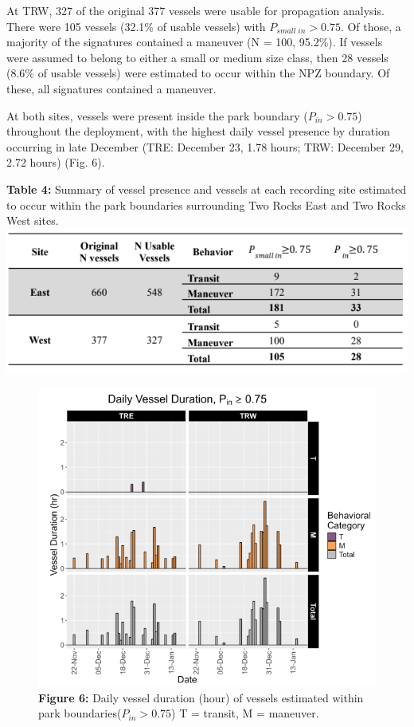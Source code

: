 \documentclass[
  letterpaper,
  oneside,
  open=any]{scrbook}
\begin{document}
At TRW, 327 of the original 377 vessels were usable for propagation
analysis. There were 105 vessels (32.1\% of usable vessels) with
\(P_{small\;in} > 0.75\). Of those, a majority of the signatures
contained a maneuver (N = 100, 95.2\%). If vessels were assumed to
belong to either a small or medium size class, then 28 vessels (8.6\% of
usable vessels) were estimated to occur within the NPZ boundary. Of
these, all signatures contained a maneuver.

At both sites, vessels were present inside the park boundary
(\(P_{in} > 0.75\)) throughout the deployment, with the highest daily
vessel presence by duration occurring in late December (TRE: December
23, 1.78 hours; TRW: December 29, 2.72 hours) (Fig. 6).

\textbf{Table 4:} Summary of vessel presence and vessels at each
recording site estimated to occur within the park boundaries surrounding
Two Rocks East and Two Rocks West sites.
\includegraphics{images/Table.4.PNG}

\begin{figure}[H]

{\centering \includegraphics{images/Figure.6.PNG}

}

\caption{\textbf{Figure 6:} Daily vessel duration (hour) of vessels
estimated within park boundaries(\(P_{in} > 0.75\)) T = transit, M =
maneuver.}

\end{figure}%
\end{document}
